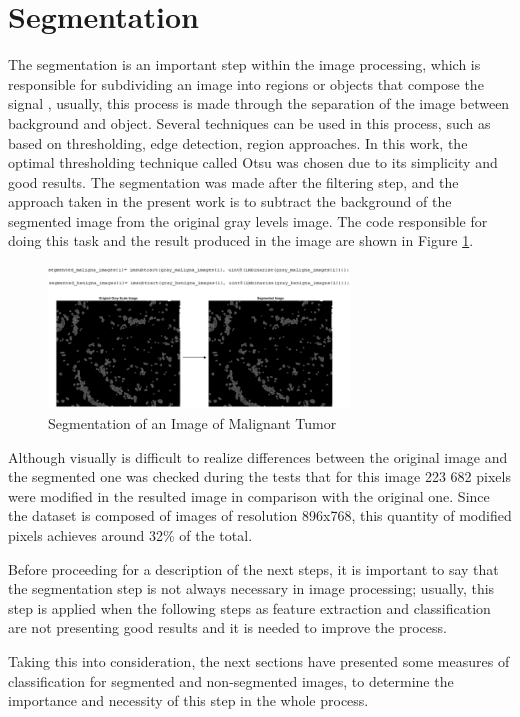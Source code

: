 \documentclass[conference]{IEEEtran}
\begin{document}
	\section{Segmentation}
        \par The segmentation is an important step within the image processing, which is responsible for subdividing an image into regions or objects that compose the signal \cite{Gonzalez:2006:DIP:1076432}, usually, this process is made through the separation of the image between background and object. Several techniques can be used in this process, such as based on thresholding, edge detection, region approaches. In this work, the optimal thresholding technique called Otsu was chosen due to its simplicity and good results. The segmentation was made after the filtering step, and the approach taken in the present work is to subtract the background of the segmented image from the original gray levels image. The code responsible for doing this task and the result produced in the image are shown in Figure \ref{fig:imagem_segmentacao}.
		
		\begin{figure}[h]
		    \centering
		    \includegraphics[width=8cm]{images/imagem_segmentacao.png}
		    \caption{Segmentation of an Image of Malignant Tumor}
		    \label{fig:imagem_segmentacao}
		\end{figure}
		
		\par Although visually is difficult to realize differences between the original image and the segmented one was checked during the tests that for this image 223 682 pixels were modified in the resulted image in comparison with the original one. Since the dataset is composed of images of resolution 896x768, this quantity of modified pixels achieves around 32\% of the total.
		\par Before proceeding for a description of the next steps, it is important to say that the segmentation step is not always necessary in image processing; usually, this step is applied when the following steps as feature extraction and classification are not presenting good results and it is needed to improve the process.
		\par Taking this into consideration, the next sections have presented some measures of classification for segmented and non-segmented images, to determine the importance and necessity of this step in the whole process.
\end{document}

